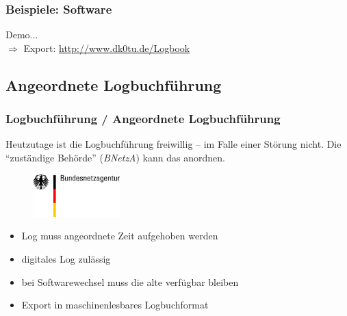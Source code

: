 \begin{frame}
  \frametitle{Beispiele: Software}

  \begin{center}

    \Large Demo... \\[3em]

    \normalsize $\Rightarrow$ Export: \ExternalLink\url{http://www.dk0tu.de/Logbook}

  \end{center}

\end{frame}

\subsection{Angeordnete Logbuchführung}

\begin{frame}
  \frametitle{Logbuchführung / Angeordnete Logbuchführung}

  Heutzutage ist die Logbuchführung freiwillig -- im Falle einer Störung nicht.
  Die ``zuständige Behörde'' (\emph{BNetzA}) kann das anordnen.

  \begin{center}
    \begin{figure}
      \includegraphics[width=0.3\textwidth,height=.3\textheight,keepaspectratio]{bv13/Bundesnetzagentur_logo_709px.png}
    \end{figure}
  \end{center}

  \begin{itemize}
    \item Log muss angeordnete Zeit aufgehoben werden
    \item digitales Log zulässig
    \item bei Softwarewechsel muss die alte verfügbar bleiben
    \item Export in maschinenlesbares Logbuchformat
  \end{itemize}

\end{frame}

